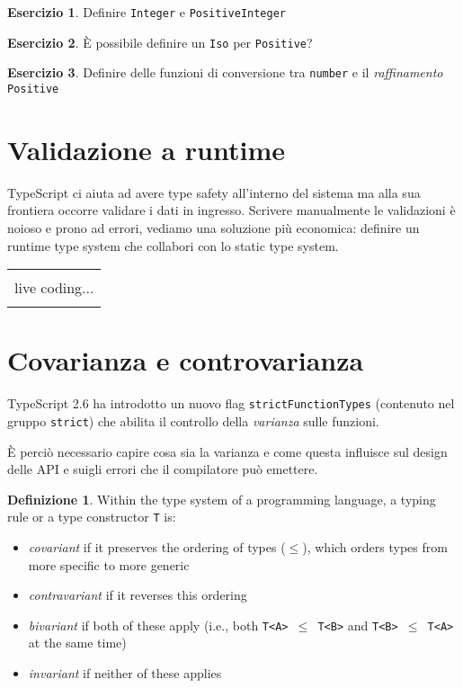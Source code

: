 \documentclass[12pt]{article}
\theoremstyle{definition}
\newtheorem{definition}{Definizione}[section]
\newtheorem{exercise}{Esercizio}[subsection]
\newenvironment{boxed}
    {\begin{center}
    \begin{tabular}{|p{0.9\textwidth}|}
    \hline\\
    }
    {
    \\\\\hline
    \end{tabular}
    \end{center}
    }
\begin{document}
\begin{exercise}
Definire \texttt{Integer} e \texttt{PositiveInteger}
\end{exercise}

\begin{exercise}
È possibile definire un \texttt{Iso} per \texttt{Positive}?
\end{exercise}

\begin{exercise}
Definire delle funzioni di conversione tra \texttt{number} e il \emph{raffinamento} \texttt{Positive}
\end{exercise}

\newpage
\section{Validazione a runtime}

TypeScript ci aiuta ad avere type safety all'interno del sistema ma alla sua frontiera occorre validare i dati in ingresso.
Scrivere manualmente le validazioni è noioso e prono ad errori, vediamo una soluzione più economica:
definire un runtime type system che collabori con lo static type system.

\begin{boxed}
live coding...
\end{boxed}

\newpage
\section{Covarianza e controvarianza}

TypeScript 2.6 ha introdotto un nuovo flag \texttt{strictFunctionTypes} (contenuto nel gruppo \texttt{strict})
che abilita il controllo della \emph{varianza} sulle funzioni.

È perciò necessario capire cosa sia la varianza e come questa influisce sul design delle API e suigli errori che il compilatore può emettere.

\begin{definition}
Within the type system of a programming language, a typing rule or a type constructor \texttt{T} is:
\begin{itemize}
\item \emph{covariant} if it preserves the ordering of types ($\leq$), which orders types from more specific to more generic
\item \emph{contravariant} if it reverses this ordering
\item \emph{bivariant} if both of these apply (i.e., both \texttt{T<A> $\leq$ T<B>} and \texttt{T<B> $\leq$ T<A>} at the same time)
\item \emph{invariant} if neither of these applies
\end{itemize}
\end{definition}
\end{document}
